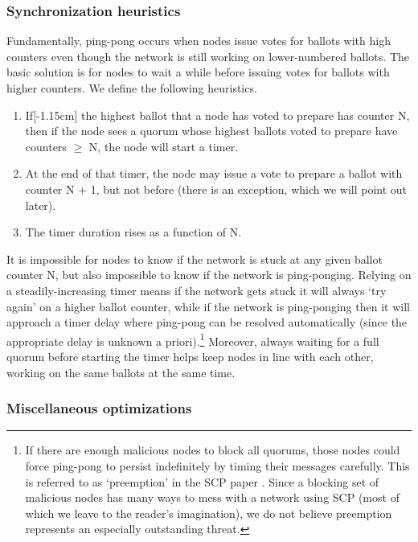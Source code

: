 \subsubsection{Synchronization heuristics}

Fundamentally, ping-pong occurs when nodes issue votes for ballots with high counters even though the network is still working on lower-numbered ballots. The basic solution is for nodes to wait a while before issuing votes for ballots with higher counters. We define the following heuristics.

\begin{enumerate}
    \item If[-1.15cm] the highest ballot that a node has voted to prepare has counter N, then if the node sees a quorum whose highest ballots voted to prepare have counters $\geq$ N, the node will start a timer.

    \item At the end of that timer, the node may issue a vote to prepare a ballot with counter N + 1, but not before (there is an exception, which we will point out later).

    \item The timer duration rises as a function of N.
\end{enumerate}

It is impossible for nodes to know if the network is stuck at any given ballot counter N, but also impossible to know if the network is ping-ponging. Relying on a steadily-increasing timer means if the network gets stuck it will always `try again' on a higher ballot counter, while if the network is ping-ponging then it will approach a timer delay where ping-pong can be resolved automatically (since the appropriate delay is unknown a priori).\footnote{If there are enough malicious nodes to block all quorums, those nodes could force ping-pong to persist indefinitely by timing their messages carefully. This is referred to as `preemption' in the SCP paper \cite{stellar-consensus-protocol}. Since a blocking set of malicious nodes has many ways to mess with a network using SCP (most of which we leave to the reader's imagination), we do not believe preemption represents an especially outstanding threat.} Moreover, always waiting for a full quorum before starting the timer helps keep nodes in line with each other, working on the same ballots at the same time.

\subsubsection{Miscellaneous optimizations}


